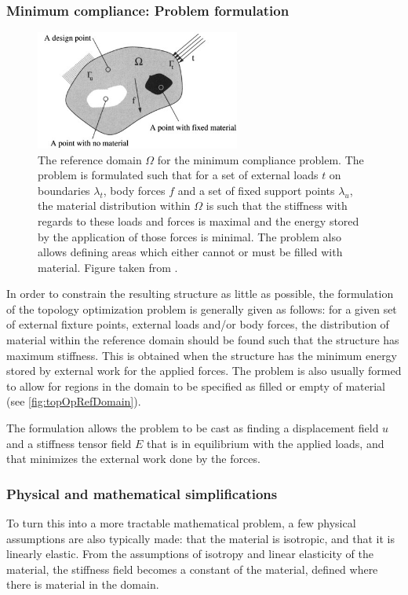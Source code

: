 \subsubsection{Minimum compliance: Problem formulation}
\begin{figure}
\centering
\includegraphics[width=0.6\textwidth]{Pictures/TopOp/design_domain.png}
\caption{The reference domain $\Omega$ for the minimum compliance problem. The problem is formulated such that for a set of external loads $t$ on boundaries $\lambda_t$, body forces $f$ and a set of fixed support points $\lambda_u$, the material distribution within $\Omega$ is such that the stiffness with regards to these loads and forces is maximal and the energy stored by the application of those forces is minimal. The problem also allows defining areas which either cannot or must be filled with material. Figure taken from \cite{bendsoe2003topology}.}
\label{fig:topOpRefDomain}
\end{figure}
In order to constrain the resulting structure as little as possible, the formulation of the topology optimization problem is generally given as follows: for a given set of external fixture points, external loads and/or body forces, the distribution of material within the reference domain should be found such that the structure has maximum stiffness. This is obtained when the structure has the minimum energy stored by external work for the applied forces. The problem is also usually formed to allow for regions in the domain to be specified as filled or empty of material (see \autoref{fig:topOpRefDomain}). 

The formulation allows the problem to be cast as finding a displacement field $u$ and a stiffness tensor field $E$ that is in equilibrium with the applied loads, and that minimizes the external work done by the forces. 

\subsubsection{Physical and mathematical simplifications}
To turn this into a more tractable mathematical problem, a few physical assumptions are also typically made: that the material is isotropic, and that it is linearly elastic. From the assumptions of isotropy and linear elasticity of the material, the stiffness field becomes a constant of the material, defined where there is material in the domain.

